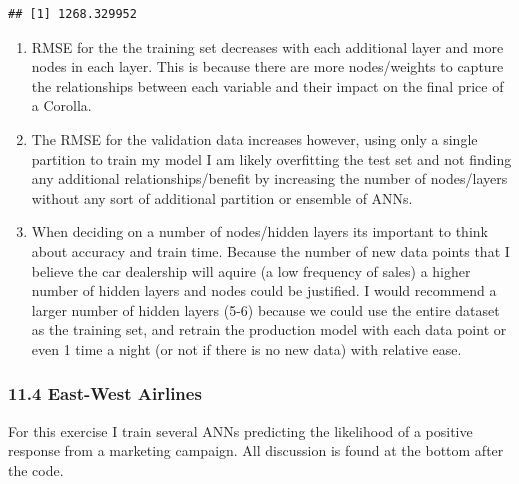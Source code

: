 \documentclass[]{article}
\begin{document}
\begin{verbatim}
## [1] 1268.329952
\end{verbatim}

\begin{enumerate}
\def\labelenumi{\roman{enumi}.}
\item
  RMSE for the the training set decreases with each additional layer and
  more nodes in each layer. This is because there are more nodes/weights
  to capture the relationships between each variable and their impact on
  the final price of a Corolla.
\item
  The RMSE for the validation data increases however, using only a
  single partition to train my model I am likely overfitting the test
  set and not finding any additional relationships/benefit by increasing
  the number of nodes/layers without any sort of additional partition or
  ensemble of ANNs.
\item
  When deciding on a number of nodes/hidden layers its important to
  think about accuracy and train time. Because the number of new data
  points that I believe the car dealership will aquire (a low frequency
  of sales) a higher number of hidden layers and nodes could be
  justified. I would recommend a larger number of hidden layers (5-6)
  because we could use the entire dataset as the training set, and
  retrain the production model with each data point or even 1 time a
  night (or not if there is no new data) with relative ease.
\end{enumerate}

\subsubsection{11.4 East-West Airlines}\label{east-west-airlines}

For this exercise I train several ANNs predicting the likelihood of a
positive response from a marketing campaign. All discussion is found at
the bottom after the code.
\end{document}
